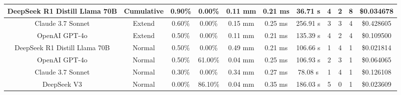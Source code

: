 \begin{table}[H]
\begin{center}
\begin{tabular}{|c|c|c|c|c|c|c|c|c|c|c|}
    \hline
    DeepSeek R1 Distill Llama 70B & Cumulative & 0.90\% & 0.00\% & 0.11 mm & 0.21 ms & 36.71 s & 4 & 2 & 8 & \$0.034678 \\
    \hline
    Claude 3.7 Sonnet & Extend & 0.60\% & 0.00\% & 0.15 mm & 0.25 ms & 256.91 s & 3 & 3 & 4 & \$0.428605 \\
    \hline
    OpenAI GPT-4o & Extend & 0.50\% & 0.00\% & 0.11 mm & 0.21 ms & 135.39 s & 4 & 2 & 4 & \$0.109500 \\
    \hline
    DeepSeek R1 Distill Llama 70B & Normal & 0.50\% & 0.00\% & 0.49 mm & 0.21 ms & 106.66 s & 1 & 4 & 1 & \$0.021814 \\
    \hline
    OpenAI GPT-4o & Normal & 0.50\% & 61.00\% & 0.04 mm & 0.25 ms & 106.93 s & 2 & 3 & 1 & \$0.064065 \\
    \hline
    Claude 3.7 Sonnet & Normal & 0.30\% & 0.00\% & 0.34 mm & 0.27 ms & 78.08 s & 1 & 4 & 1 & \$0.126108 \\
    \hline
    DeepSeek V3 & Normal & 0.00\% & 86.10\% & 0.04 mm & 0.35 ms & 186.03 s & 5 & 0 & 1 & \$0.023609 \\
    \hline
\end{tabular}
\label{Results-Position-3-5}
\end{center}
\end{table}

